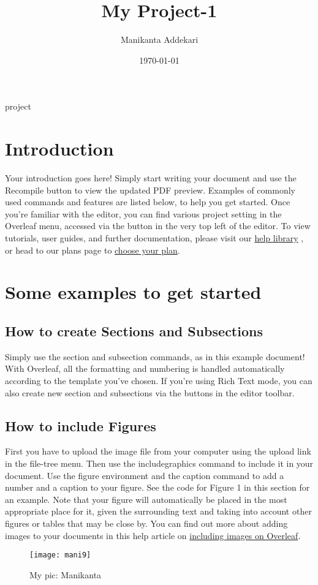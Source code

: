 \documentclass{article}
\title{My Project-1}
\author{Manikanta Addekari}
\date{\today}
\begin{document}
	\maketitle
	 \hspace{4.50cm} {project}
\section{Introduction}
  Your introduction goes here! Simply start writing your document and use the Recompile button to
  view the updated PDF preview. Examples of commonly used commands and features are listed below,
  to help you get started.\vspace{5mm} Once you’re familiar with the editor, you can find various project setting in the Overleaf menu,
  accessed via the button in the very top left of the editor. To view tutorials, user guides, and further
  documentation, please visit our \href{www.#.com}{help library} , or head to our plans page to \href{www.#.com}{choose your plan}.
 \section{Some examples to get started}
 \subsection{How to create Sections and Subsections}
 Simply use the section and subsection commands, as in this example document! With Overleaf, all
 the formatting and numbering is handled automatically according to the template you’ve chosen. If
 you’re using Rich Text mode, you can also create new section and subsections via the buttons in the
 editor toolbar.
 
 \subsection{How to include Figures}
 First you have to upload the image file from your computer using the upload link in the file-tree menu.
 Then use the includegraphics command to include it in your document. Use the figure environment
 and the caption command to add a number and a caption to your figure. See the code for Figure 1 in
 this section for an example.
 Note that your figure will automatically be placed in the most appropriate place for it, given the
 surrounding text and taking into account other figures or tables that may be close by. You can find
 out more about adding images to your documents in this help article on \href{www.#.com}{including images on Overleaf}.
\begin{figure}
	\centering
	\texttt{[image: mani9]}
	\caption{My pic: Manikanta}
	\label{fig:mani9}
\end{figure}
\end{document}
